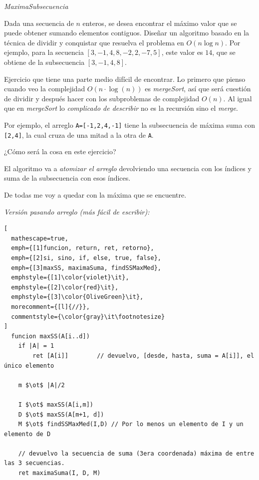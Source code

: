 \begin{enunciado}{\ejercicio[MáximoSubsecuencia]}
  \textit{MaximaSubsecuencia}

  Dada una secuencia de $n$ enteros, se desea encontrar el máximo valor que se puede obtener sumando elementos
  contiguos. Diseñar un algoritmo basado en la técnica de dividir y conquistar que resuelva el problema en
  $O(n \log n)$. Por ejemplo, para la secuencia $[3,-1, 4, 8, -2, 2, -7, 5]$, este valor es $14$, que se obtiene de la
  subsecuencia $[3, -1, 4, 8]$.
\end{enunciado}

Ejercicio que tiene una parte medio difícil de encontrar. Lo primero que pienso cuando veo la
complejidad $O(n \cdot \log(n))$ es \textit{mergeSort}, así que será cuestión de dividir y después hacer con los
subproblemas de complejidad $O(n)$. Al igual que en \textit{mergeSort} lo \textit{complicado de describir} no es
la recursión sino el \textit{merge}.

Por ejemplo, el arreglo \texttt{A=[-1,2,4,-1]} tiene la subsecuencia de máxima suma con  \texttt{[2,4]}, la cual cruza de una mitad a la otra de \texttt{A}.

\medskip

¿Cómo será la cosa en este ejercicio?

\medskip


El algoritmo va a \textit{atomizar el arreglo} devolviendo una secuencia con los índices y suma de la subsecuencia con esos índices.

De todas me voy a quedar con la máxima que se encuentre.

\textit{Versión pasando arreglo (más fácil de escribir):}
\begin{tcolorbox}
  \begin{lstlisting}[
  mathescape=true,
  emph={[1]funcion, return, ret, retorno},
  emph={[2]si, sino, if, else, true, false},
  emph={[3]maxSS, maximaSuma, findSSMaxMed},
  emphstyle={[1]\color{violet}\it},
  emphstyle={[2]\color{red}\it},
  emphstyle={[3]\color{OliveGreen}\it},
  morecomment={[l]{//}},
  commentstyle={\color{gray}\it\footnotesize}
]
  funcion maxSS(A[i..d])
    if |A| = 1
        ret [A[i]]        // devuelvo, [desde, hasta, suma = A[i]], el único elemento

    m $\ot$ |A|/2

    I $\ot$ maxSS(A[i,m])
    D $\ot$ maxSS(A[m+1, d])
    M $\ot$ findSSMaxMed(I,D) // Por lo menos un elemento de I y un elemento de D

    // devuelvo la secuencia de suma (3era coordenada) máxima de entre las 3 secuencias.
    ret maximaSuma(I, D, M)\end{lstlisting}
\end{tcolorbox}

